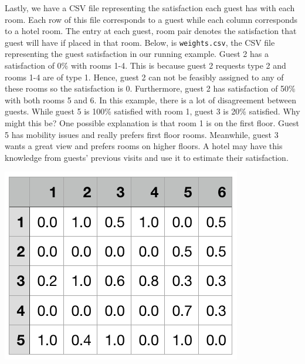 \documentclass[11 pt]{article}
\begin{document}
\par Lastly, we have a CSV file representing the satisfaction each guest has with each room. Each row of this file corresponds to a guest while each column corresponds to a hotel room. The entry at each guest, room pair denotes the satisfaction that guest will have if placed in that room. Below, is \texttt{weights.csv}, the CSV file representing the guest satisfaction in our running example. Guest 2 has a satisfaction of 0\% with rooms 1-4. This is because guest 2 requests type 2 and rooms 1-4 are of type 1. Hence, guest 2 can not be feasibly assigned to any of these rooms so the satisfaction is 0. Furthermore, guest 2 has satisfaction of 50\% with both rooms 5 and 6. In this example, there is a lot of disagreement between guests. While guest 5 is 100\% satisfied with room 1, guest 3 is 20\% satisfied. Why might this be? One possible explanation is that room 1 is on the first floor. Guest 5 has mobility issues and really prefers first floor rooms. Meanwhile, guest 3 wants a great view and prefers rooms on higher floors. A hotel may have this knowledge from guests' previous visits and use it to estimate their satisfaction.
\begin{center}
\includegraphics[scale=0.7]{images/weightsCSV.png}
\end{center}
\end{document}
